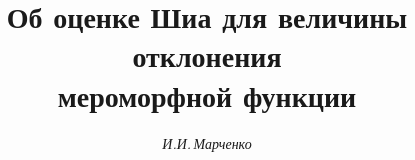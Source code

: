 

 


%  


\newcommand{\tts}[1]{} 


 




 


\setcounter{page}{46} 












 


\author{\it И.И.\,Марченко} 




\title{Об оценке Шиа для величины отклонения\\


мероморфной функции} 


 


\date{} 




\pagestyle{plain} %


 




\maketitle 


\label{begin} 


 



